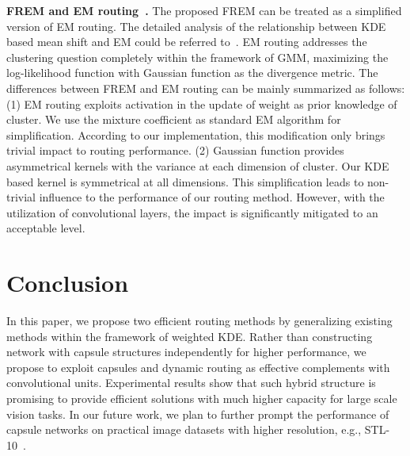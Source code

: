 \documentclass[runningheads]{llncs}
\begin{document}
\textbf{FREM and EM routing~\cite{hinton2018emrouting}.} The proposed FREM can be treated as a simplified version of EM routing. The detailed analysis of the relationship between KDE based mean shift and EM could be referred to~\cite{4135673}. EM routing addresses the clustering question completely within the framework of GMM, maximizing the log-likelihood function with Gaussian function as the divergence metric. The differences between FREM and EM routing can be mainly summarized as follows: (1) EM routing exploits activation  in the update of weight  as prior knowledge of cluster. We use the mixture coefficient  as standard EM algorithm for simplification. According to our implementation, this modification only brings trivial impact to routing performance. (2) Gaussian function provides asymmetrical kernels with the variance  at each dimension of cluster. Our KDE based kernel is symmetrical at all dimensions. This simplification leads to non-trivial influence to the performance of our routing method. However, with the utilization of convolutional layers, the impact is significantly mitigated to an acceptable level. 






\section{Conclusion}
In this paper, we propose two efficient routing methods by generalizing existing methods within the framework of weighted KDE. Rather than constructing network with capsule structures independently for higher performance, we propose to exploit capsules and dynamic routing as effective complements with convolutional units. Experimental results show that such hybrid structure is promising to provide efficient solutions with much higher capacity for large scale vision tasks. In our future work, we plan to further prompt the performance of capsule networks on practical image datasets with higher resolution, e.g., STL-10~\cite{coates2011analysis}.


\end{document}
